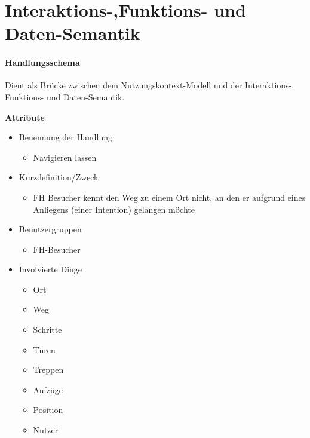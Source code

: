 \chapter{Interaktions-,Funktions- und Daten-Semantik}

\subsubsection*{Handlungsschema}
Dient als Brücke zwischen dem Nutzungskontext-Modell und der Interaktions-, Funktions- und Daten-Semantik.

\textbf{Attribute}
\begin{itemize}
\item Benennung der Handlung
    \begin{itemize}
    \item Navigieren lassen
    \end{itemize}
\item Kurzdefinition/Zweck
    \begin{itemize}
    \item FH Besucher kennt den Weg zu einem Ort    nicht, an den er aufgrund eines Anliegens (einer Intention) gelangen möchte
    \end{itemize}
\item Benutzergruppen
    \begin{itemize}
    \item FH-Besucher
    \end{itemize}
\item Involvierte Dinge
    \begin{itemize}
    \item Ort
    \item Weg
    \item Schritte
    \item Türen
    \item Treppen
    \item Aufzüge
    \item Position
    \item Nutzer
    \end{itemize}
\end{itemize}


